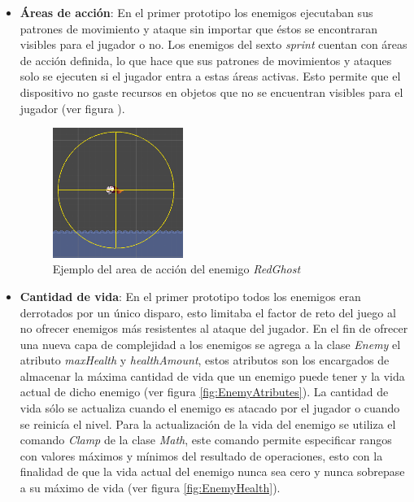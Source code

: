 	\begin{itemize}
		 \item \textbf{Áreas de acción}: En el primer prototipo los enemigos ejecutaban 
		 sus patrones de movimiento y ataque sin importar que éstos se encontraran 
		 visibles para el jugador o no. Los enemigos del sexto \textit{sprint} 
		 cuentan con áreas de acción definida, lo que hace que sus patrones de 
		 movimientos y ataques solo se ejecuten si el jugador entra a estas áreas 
		 activas. Esto permite que el dispositivo no gaste recursos en objetos que no se 
		 encuentran visibles para el jugador (ver figura ).
		 
			 \begin{figure}[h]
	    			\centering
	    			\includegraphics[width=0.4\textwidth]{03TrabajoRealizado/imagenes/EnemyRaycasting.png}
	    			\caption{Ejemplo del area de acción del enemigo \textit{RedGhost}}
	    			\label{fig:EnemyArea}
				\end{figure}
		   
		 \item \textbf{Cantidad de vida}: En el primer prototipo todos los enemigos 
		 eran derrotados por un único disparo, esto limitaba el factor de reto del 
		 juego al no ofrecer enemigos más resistentes al ataque del jugador. En el 
		 fin de ofrecer una nueva capa de complejidad a los enemigos se agrega a la 
		 clase \textit{Enemy} el atributo \textit{maxHealth} y \textit{healthAmount}, 
		 estos atributos son los encargados de almacenar la máxima cantidad de vida 
		 que un enemigo puede tener y la vida actual de dicho enemigo (ver figura 
		 \ref{fig:EnemyAtributes}). La cantidad de 
		 vida sólo se actualiza cuando el enemigo es atacado por el jugador o cuando 
		 se reinicía el nivel. Para la actualización de la vida del enemigo se utiliza 
		 el comando \textit{Clamp} de la clase \textit{Math}, este comando permite 
		 especificar rangos con valores máximos y mínimos del resultado de operaciones, 
		 esto con la finalidad de que la vida actual del enemigo nunca sea cero y nunca 
		 sobrepase a su máximo de vida (ver figura \ref{fig:EnemyHealth}).
		 

\end{itemize}
